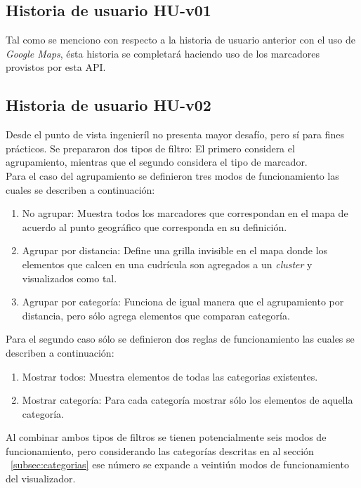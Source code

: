 \subsection{Historia de usuario HU-v01}
\label{subsec:HU-v01}

Tal como se menciono con respecto a la historia de usuario anterior con el uso de \textit{Google Maps}, ésta historia se completará haciendo uso de los marcadores provistos por esta API.\\

\subsection{Historia de usuario HU-v02}
\label{subsec:HU-v02}

Desde el punto de vista ingenieríl no presenta mayor desafío, pero sí para fines prácticos. Se prepararon dos tipos de filtro: El primero considera el agrupamiento, mientras que el segundo considera el tipo de marcador.\\

Para el caso del agrupamiento se definieron tres modos de funcionamiento las cuales se describen a continuación:

\begin{enumerate}
\item No agrupar: Muestra todos los marcadores que correspondan en el mapa de acuerdo al punto geográfico que corresponda en su definición.
\item Agrupar por distancia: Define una grilla invisible en el mapa donde los elementos que calcen en una cudrícula son agregados a un \textit{cluster} y visualizados como tal.
\item Agrupar por categoría: Funciona de igual manera que el agrupamiento por distancia, pero sólo agrega elementos que comparan categoría.
\end{enumerate}

Para el segundo caso sólo se definieron dos reglas de funcionamiento las cuales se describen a continuación:

\begin{enumerate}
\item Mostrar todos: Muestra elementos de todas las categorias existentes.
\item Mostrar categoría: Para cada categoría mostrar sólo los elementos de aquella categoría. 
\end{enumerate}

Al combinar ambos tipos de filtros se tienen potencialmente seis modos de funcionamiento, pero considerando las categorías descritas en al sección ~\ref{subsec:categorias} ese número se expande a veintiún modos de funcionamiento del visualizador.\\

